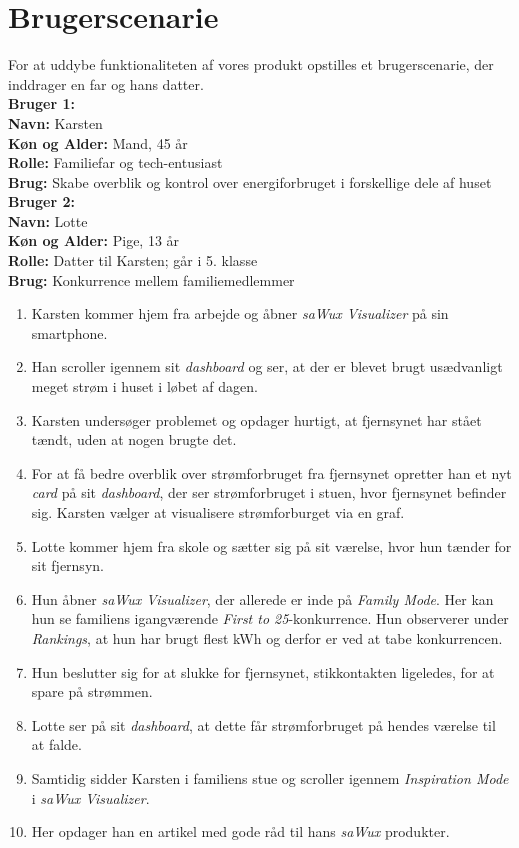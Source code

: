 \chapter{Brugerscenarie}
For at uddybe funktionaliteten af vores produkt opstilles et brugerscenarie, der inddrager en far og hans datter.\\

\textbf{Bruger 1:}\\
\textbf{Navn:} Karsten\\
\textbf{Køn og Alder:} Mand, 45 år\\
\textbf{Rolle:} Familiefar og tech-entusiast\\
\textbf{Brug:} Skabe overblik og kontrol over energiforbruget i forskellige dele af huset\\[0.5ex]

\textbf{Bruger 2:}\\
\textbf{Navn:} Lotte\\
\textbf{Køn og Alder:} Pige, 13 år\\
\textbf{Rolle:} Datter til Karsten; går i 5. klasse\\
\textbf{Brug:} Konkurrence mellem familiemedlemmer\\[0.5ex]

\begin{enumerate}
    \item Karsten kommer hjem fra arbejde og åbner \emph{saWux Visualizer} på sin smartphone.
    \item Han scroller igennem sit \emph{dashboard} og ser, at der er blevet brugt usædvanligt meget strøm i huset i løbet af dagen.
    \item Karsten undersøger problemet og opdager hurtigt, at fjernsynet har stået tændt, uden at nogen brugte det. 
    \item For at få bedre overblik over strømforbruget fra fjernsynet opretter han et nyt \emph{card} på sit \emph{dashboard}, der ser strømforbruget i stuen, hvor fjernsynet befinder sig. Karsten vælger at visualisere strømforburget via en graf.

    \item Lotte kommer hjem fra skole og sætter sig på sit værelse, hvor hun tænder for sit fjernsyn.
    \item Hun åbner \emph{saWux Visualizer}, der allerede er inde på \emph{Family Mode}. Her kan hun se familiens igangværende \emph{First to 25}-konkurrence. Hun observerer under \emph{Rankings}, at hun har brugt flest kWh og derfor er ved at tabe konkurrencen. 
    \item Hun beslutter sig for at slukke for fjernsynet, stikkontakten ligeledes, for at spare på strømmen.
    \item Lotte ser på sit \emph{dashboard}, at dette får strømforbruget på hendes værelse til at falde.
    \item Samtidig sidder Karsten i familiens stue og scroller igennem \emph{Inspiration Mode} i \emph{saWux Visualizer}.
    \item Her opdager han en artikel med gode råd til hans \emph{saWux} produkter.
\end{enumerate}


